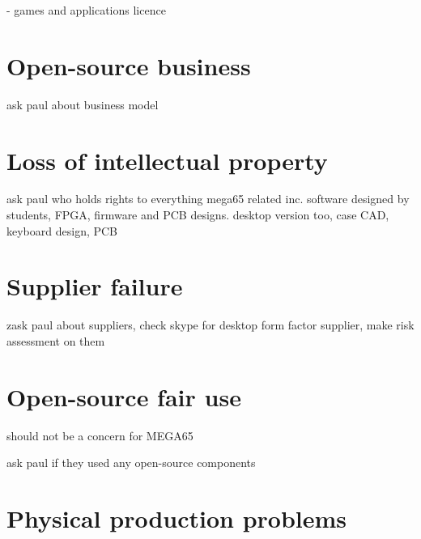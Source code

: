 - games and applications licence

\section{Open-source business}
ask paul about business model


\section{Loss of intellectual property}
ask paul who holds rights to everything mega65 related inc. software designed by students, FPGA, firmware and PCB designs. desktop version too, case CAD, keyboard design, PCB


\section{Supplier failure}
zask paul about suppliers, check skype for desktop form factor supplier, make risk assessment on them



\section{Open-source fair use}
should not be a concern for MEGA65

ask paul if they used any open-source components


\section{Physical production problems}
